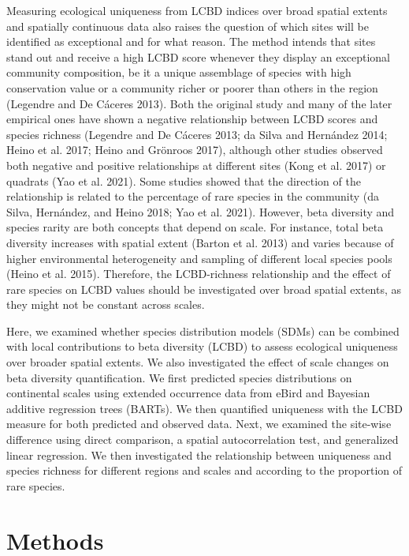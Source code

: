 \documentclass[11pt]{article}
\begin{document}
Measuring ecological uniqueness from LCBD indices over broad spatial
extents and spatially continuous data also raises the question of which
sites will be identified as exceptional and for what reason. The method
intends that sites stand out and receive a high LCBD score whenever they
display an exceptional community composition, be it a unique assemblage
of species with high conservation value or a community richer or poorer
than others in the region (Legendre and De Cáceres 2013). Both the
original study and many of the later empirical ones have shown a
negative relationship between LCBD scores and species richness (Legendre
and De Cáceres 2013; da Silva and Hernández 2014; Heino et al. 2017;
Heino and Grönroos 2017), although other studies observed both negative
and positive relationships at different sites (Kong et al. 2017) or
quadrats (Yao et al. 2021). Some studies showed that the direction of
the relationship is related to the percentage of rare species in the
community (da Silva, Hernández, and Heino 2018; Yao et al. 2021).
However, beta diversity and species rarity are both concepts that depend
on scale. For instance, total beta diversity increases with spatial
extent (Barton et al. 2013) and varies because of higher environmental
heterogeneity and sampling of different local species pools (Heino et
al. 2015). Therefore, the LCBD-richness relationship and the effect of
rare species on LCBD values should be investigated over broad spatial
extents, as they might not be constant across scales.

Here, we examined whether species distribution models (SDMs) can be
combined with local contributions to beta diversity (LCBD) to assess
ecological uniqueness over broader spatial extents. We also investigated
the effect of scale changes on beta diversity quantification. We first
predicted species distributions on continental scales using extended
occurrence data from eBird and Bayesian additive regression trees
(BARTs). We then quantified uniqueness with the LCBD measure for both
predicted and observed data. Next, we examined the site-wise difference
using direct comparison, a spatial autocorrelation test, and generalized
linear regression. We then investigated the relationship between
uniqueness and species richness for different regions and scales and
according to the proportion of rare species.

\hypertarget{methods}{%
\section{Methods}\label{methods}}
\end{document}
